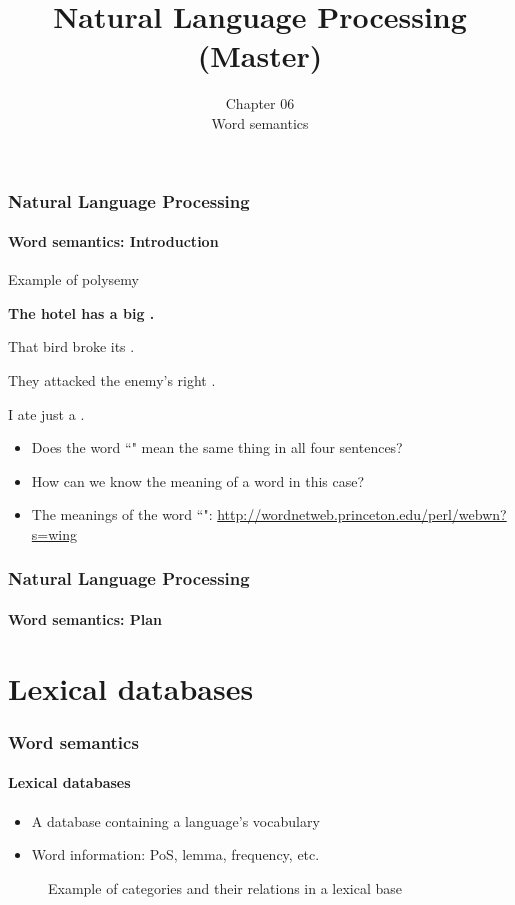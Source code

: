\documentclass[xcolor=table]{beamer}
\title[ESI - NLP(master)]%
{Natural Language Processing (Master)}
\subtitle[06- Word semantics]%
{Chapter 06\\Word semantics}
\begin{document}
	
\begin{frame}
\frametitle{Natural Language Processing}
\framesubtitle{Word semantics: Introduction}

\begin{exampleblock}{Example of polysemy}
	\begin{center}
		\Large\bfseries
			The hotel has a big .
			 
			That bird broke its .
			
			They attacked the enemy's right .
			
			I ate just a .
	\end{center}
\end{exampleblock}

\begin{itemize}
	\item Does the word ``" mean the same thing in all four sentences?
	\item How can we know the meaning of a word in this case?
	\item The meanings of the word ``": \url{http://wordnetweb.princeton.edu/perl/webwn?s=wing}
\end{itemize}

\end{frame}

\begin{frame}
\frametitle{Natural Language Processing}
\framesubtitle{Word semantics: Plan}

\begin{multicols}{2}
\tableofcontents
\end{multicols}
\end{frame}

\section{Lexical databases}

\begin{frame}
	\frametitle{Word semantics}
	\framesubtitle{Lexical databases}

	\begin{itemize}
		\item A database containing a language's vocabulary
		\item Word information: PoS, lemma, frequency, etc.
	\end{itemize}

	\begin{figure}
		\centering 
		\caption{Example of categories and their relations in a lexical base \cite{2019-white-al}}
	\end{figure}
	
\end{frame}
\end{document}
